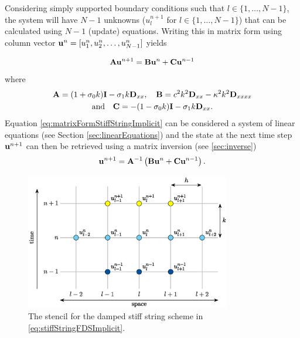 {Considering simply supported boundary conditions such that $l \in \{1, \hdots, N-1\}$, the system will have $N-1$ unknowns ($u_l^{n+1}$ for $l \in \{1, \hdots, N-1\}$) that can be calculated using $N-1$ (update) equations. Writing this in matrix form using column vector $\mathbf{u}^n = [u_1^n, u_2^n, \hdots, u_{N-1}^n]$ yields 

\begin{equation}\label{eq:matrixFormStiffStringImplicit}
    \mathbf{A}\mathbf{u}^{n+1} = \mathbf{B}\mathbf{u}^n + \mathbf{C} \mathbf{u}^{n-1}
\end{equation}
where 
\begin{equation*}
    \begin{gathered}
    \mathbf{A} = (1+\sigma_{0} k)\mathbf{I} - \sigma_{1} k\mathbf{D}_{xx}, \quad \mathbf{B} = c^2 k^2 \mathbf{D}_{xx} - \kappa^2 k^2 \mathbf{D}_{xxxx} \\
    \text{and} \quad \mathbf{C} = -(1-\sigma_{0} k)\mathbf{I} - \sigma_{1} k \mathbf{D}_{xx}.
    \end{gathered}
\end{equation*}
Equation \eqref{eq:matrixFormStiffStringImplicit} can be considered a system of linear equations (see Section \ref{sec:linearEquations}) and the state at the next time step $\mathbf{u}^{n+1}$ can then be retrieved using a matrix inversion (see \ref{sec:inverse})
\begin{equation}
    \mathbf{u}^{n+1} = \mathbf{A}^{-1}\left(\mathbf{B}\mathbf{u}^n + \mathbf{C} \mathbf{u}^{n-1}\right).
\end{equation}
\begin{figure}[h]
    \centering
    \includegraphics[width=0.8\textwidth]{figures/resonators/stencilImplicitStiffString.eps}
    \caption{The stencil for the damped stiff string scheme in \eqref{eq:stiffStringFDSImplicit}.\label{fig:stencilStiffStringImplicit}}
\end{figure}

}
